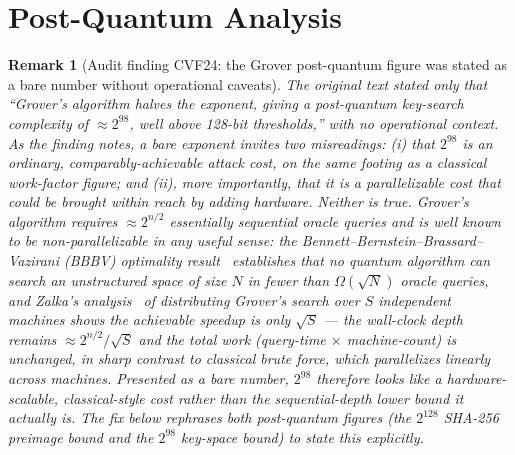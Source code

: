 \documentclass[11pt,a4paper]{article}
\newtheorem{remark}[theorem]{Remark}
\begin{document}
\section{Post-Quantum Analysis}
\label{sec:pq}

\begin{remark}[Audit finding CVF24: the Grover post-quantum figure was stated as a bare number without operational caveats]
\label{rem:cvf24}
The original text stated only that ``Grover's algorithm halves the
exponent, giving a post-quantum key-search complexity of $\approx 2^{98}$,
well above 128-bit thresholds,'' with no operational context. As the
finding notes, a bare exponent invites two misreadings: (i) that
$2^{98}$ is an ordinary, comparably-achievable attack cost, on the same
footing as a classical work-factor figure; and (ii), more importantly,
that it is a \emph{parallelizable} cost that could be brought within
reach by adding hardware. Neither is true. Grover's algorithm requires
$\approx 2^{n/2}$ \emph{essentially sequential} oracle queries and is
well known to be non-parallelizable in any useful sense: the
Bennett--Bernstein--Brassard--Vazirani (BBBV) optimality
result~\cite{bbbv1997} establishes that no quantum algorithm can search
an unstructured space of size $N$ in fewer than $\Omega(\sqrt{N})$ oracle
queries, and Zalka's analysis~\cite{zalka1999} of distributing Grover's
search over $S$ independent machines shows the achievable speedup is only
$\sqrt{S}$ --- the wall-clock \emph{depth} remains
$\approx 2^{n/2}/\sqrt{S}$ and the \emph{total} work (query-time
$\times$ machine-count) is unchanged, in sharp contrast to classical
brute force, which parallelizes linearly across machines. Presented as a
bare number, $2^{98}$ therefore looks like a hardware-scalable,
classical-style cost rather than the sequential-depth lower bound it
actually is. The fix below rephrases both post-quantum figures (the
$2^{128}$ SHA-256 preimage bound and the $2^{98}$ key-space bound) to
state this explicitly.
\end{remark}
\end{document}
